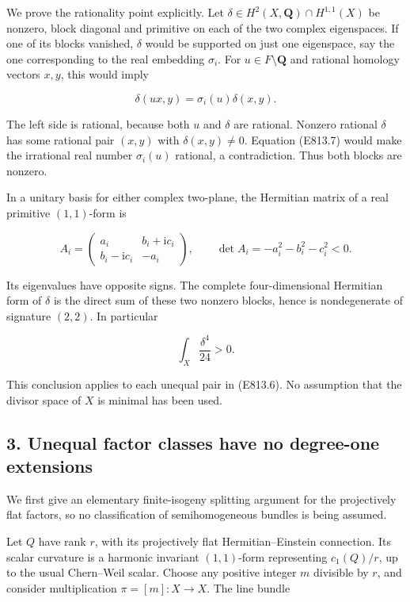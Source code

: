 We prove the rationality point explicitly. Let
\(\delta\in H^2(X,\mathbf Q)\cap H^{1,1}(X)\) be nonzero, block diagonal
and primitive on each of the two complex eigenspaces. If one of its
blocks vanished, \(\delta\) would be supported on just one eigenspace,
say the one corresponding to the real embedding \(\sigma_i\). For
\(u\in F\setminus\mathbf Q\) and rational homology vectors \(x,y\), this
would imply

\[
 \delta(ux,y)=\sigma_i(u)\delta(x,y).
 \tag{E813.7}
\]

The left side is rational, because both \(u\) and \(\delta\) are
rational. Nonzero rational \(\delta\) has some rational pair \((x,y)\)
with \(\delta(x,y)\ne0\). Equation (E813.7) would make the irrational
real number \(\sigma_i(u)\) rational, a contradiction. Thus both blocks
are nonzero.

In a unitary basis for either complex two-plane, the Hermitian matrix of
a real primitive \((1,1)\)-form is

\[
 A_i=\begin{pmatrix}a_i&b_i+\mathrm i c_i\\
                      b_i-\mathrm i c_i&-a_i\end{pmatrix},
 \qquad
 \det A_i=-a_i^2-b_i^2-c_i^2<0.
 \tag{E813.8}
\]

Its eigenvalues have opposite signs. The complete four-dimensional
Hermitian form of \(\delta\) is the direct sum of these two nonzero
blocks, hence is nondegenerate of signature \((2,2)\). In particular

\[
 \int_X\frac{\delta^4}{24}>0.
 \tag{E813.9}
\]

This conclusion applies to each unequal pair in (E813.6). No assumption
that the divisor space of \(X\) is minimal has been used.

\subsection{3. Unequal factor classes have no degree-one
extensions}\label{SF-E813-unequal-factor-classes-have-no-degree-one-extensions}

We first give an elementary finite-isogeny splitting argument for the
projectively flat factors, so no classification of semihomogeneous
bundles is being assumed.

Let \(Q\) have rank \(r\), with its projectively flat
Hermitian--Einstein connection. Its scalar curvature is a harmonic
invariant \((1,1)\)-form representing \(c_1(Q)/r\), up to the usual
Chern--Weil scalar. Choose any positive integer \(m\) divisible by
\(r\), and consider multiplication \(\pi=[m]:X\to X\). The line bundle


